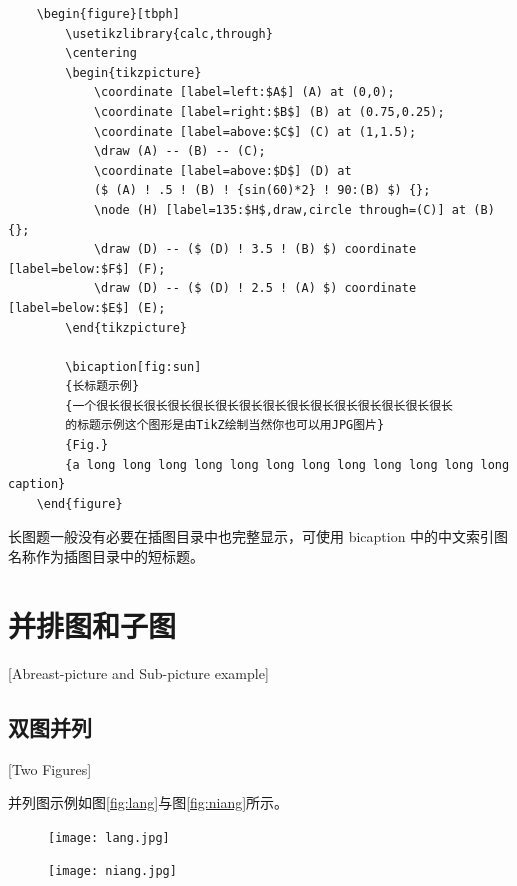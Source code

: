 \begin{lstlisting}
    \begin{figure}[tbph]
        \usetikzlibrary{calc,through}
        \centering
        \begin{tikzpicture}
            \coordinate [label=left:$A$] (A) at (0,0);
            \coordinate [label=right:$B$] (B) at (0.75,0.25);
            \coordinate [label=above:$C$] (C) at (1,1.5);
            \draw (A) -- (B) -- (C);
            \coordinate [label=above:$D$] (D) at
            ($ (A) ! .5 ! (B) ! {sin(60)*2} ! 90:(B) $) {};
            \node (H) [label=135:$H$,draw,circle through=(C)] at (B) {};
            \draw (D) -- ($ (D) ! 3.5 ! (B) $) coordinate [label=below:$F$] (F);
            \draw (D) -- ($ (D) ! 2.5 ! (A) $) coordinate [label=below:$E$] (E);
        \end{tikzpicture}

        \bicaption[fig:sun]
        {长标题示例}
        {一个很长很长很长很长很长很长很长很长很长很长很长很长很长很长很长
        的标题示例这个图形是由TikZ绘制当然你也可以用JPG图片}
        {Fig.}
        {a long long long long long long long long long long long long caption}
    \end{figure}
\end{lstlisting}

长图题一般没有必要在插图目录中也完整显示，可使用 \cs bicaption 中的中文索引图名称作为插图目录中的短标题。

\section{并排图和子图}[Abreast-picture and Sub-picture example]
\subsection{双图并列}[Two Figures]

并列图示例如图\ref{fig:lang}与图\ref{fig:niang}所示。

\begin{figure}[htbp]
  \centering
  \begin{minipage}{0.4\textwidth}
    \centering
    \texttt{[image: lang.jpg]}
  \end{minipage}
  \begin{minipage}{0.4\textwidth}
    \centering
    \texttt{[image: niang.jpg]}
  \end{minipage}
\end{figure}

